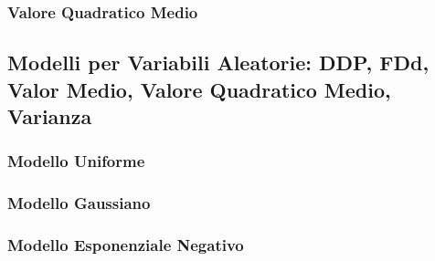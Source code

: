\documentclass[12pt,oneside,openany]{memoir}
\numberwithin{equation}{subsection}
\begin{document}

\subsubsection{Valore Quadratico Medio}


\subsection{Modelli per Variabili Aleatorie: DDP, FDd, Valor Medio, Valore
Quadratico Medio, Varianza}


\subsubsection{Modello Uniforme}


\subsubsection{Modello Gaussiano}


\subsubsection{Modello Esponenziale Negativo}

\end{document}

